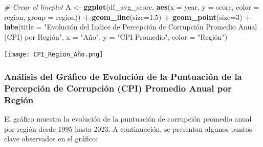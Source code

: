 \documentclass[
]{article}
\newenvironment{Shaded}{\begin{snugshade}}{\end{snugshade}}
\newcommand{\AttributeTok}[1]{\textcolor[rgb]{0.13,0.29,0.53}{#1}}
\newcommand{\CommentTok}[1]{\textcolor[rgb]{0.56,0.35,0.01}{\textit{#1}}}
\newcommand{\DecValTok}[1]{\textcolor[rgb]{0.00,0.00,0.81}{#1}}
\newcommand{\FloatTok}[1]{\textcolor[rgb]{0.00,0.00,0.81}{#1}}
\newcommand{\FunctionTok}[1]{\textcolor[rgb]{0.13,0.29,0.53}{\textbf{#1}}}
\newcommand{\NormalTok}[1]{#1}
\newcommand{\OtherTok}[1]{\textcolor[rgb]{0.56,0.35,0.01}{#1}}
\newcommand{\SpecialCharTok}[1]{\textcolor[rgb]{0.81,0.36,0.00}{\textbf{#1}}}
\newcommand{\StringTok}[1]{\textcolor[rgb]{0.31,0.60,0.02}{#1}}
\begin{document}
\begin{Shaded}
\begin{Highlighting}[]
\CommentTok{\# Crear el lineplot}
\NormalTok{A }\OtherTok{\textless{}{-}} \FunctionTok{ggplot}\NormalTok{(df\_avg\_score, }\FunctionTok{aes}\NormalTok{(}\AttributeTok{x =}\NormalTok{ year, }\AttributeTok{y =}\NormalTok{ score, }\AttributeTok{color =}\NormalTok{ region, }\AttributeTok{group =}\NormalTok{ region)) }\SpecialCharTok{+}
    \FunctionTok{geom\_line}\NormalTok{(}\AttributeTok{size=}\FloatTok{1.5}\NormalTok{) }\SpecialCharTok{+}
    \FunctionTok{geom\_point}\NormalTok{(}\AttributeTok{size=}\DecValTok{3}\NormalTok{) }\SpecialCharTok{+}
    \FunctionTok{labs}\NormalTok{(}\AttributeTok{title =} \StringTok{"Evolución del Indice de Percepción de Corrupción Promedio Anual (CPI) por Región"}\NormalTok{,}
         \AttributeTok{x =} \StringTok{"Año"}\NormalTok{,}
         \AttributeTok{y =} \StringTok{"CPI Promedio"}\NormalTok{,}
         \AttributeTok{color =} \StringTok{"Región"}\NormalTok{)}
\end{Highlighting}
\end{Shaded}

\texttt{[image: CPI\_Region\_Año.png]}

\subsubsection{Análisis del Gráfico de Evolución de la Puntuación de la
Percepción de Corrupción (CPI) Promedio Anual por
Región}\label{analisis-del-grafico-de-la-evolucion-del-indice-de-percepcion-de-corrupcion-promedio-anual-cpi-por-region}

El gráfico muestra la evolución de la puntuación de corrupción promedio
anual por región desde 1995 hasta 2023. A continuación, se presentan
algunos puntos clave observados en el gráfico:
\end{document}

